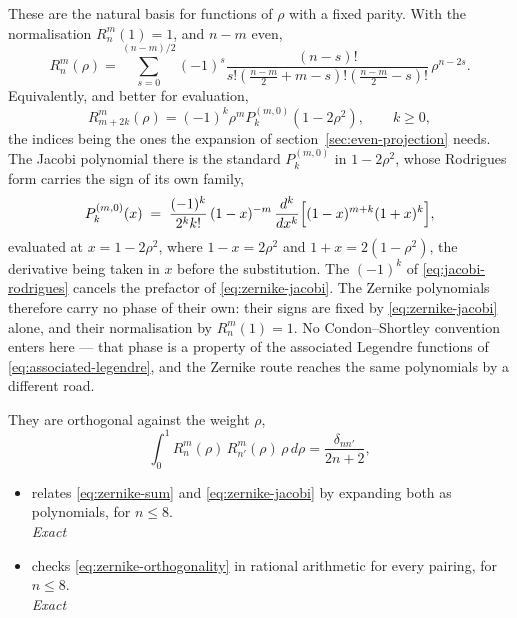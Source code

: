 These are the natural basis for functions of $\rho$ with a fixed parity.  With the
normalisation $R_n^m(1) = 1$, and $n-m$ even,
\begin{equation}
  R_n^m(\rho) = \sum_{s=0}^{(n-m)/2} (-1)^s
  \frac{(n-s)!}{s! \left(\frac{n-m}{2}+m-s\right)! \left(\frac{n-m}{2}-s\right)!}\,
  \rho^{n-2s} .
  \label{eq:zernike-sum}
\end{equation}
Equivalently, and better for evaluation,
\begin{equation}
  R_{m+2k}^m(\rho) = (-1)^{k} \rho^m P_k^{(m,0)}\!\left(1-2\rho^2\right) ,
  \qquad k \ge 0 ,
  \label{eq:zernike-jacobi}
\end{equation}
the indices being the ones the expansion of section~\ref{sec:even-projection} needs.  The Jacobi
polynomial there is the standard $P_k^{(m,0)}$ in $1-2\rho^2$, whose Rodrigues form carries the
sign of its own family,
\begin{equation}
  P_k^{(m,0)}(x) \;=\; \frac{(-1)^{k}}{2^{k}k!}\,(1-x)^{-m}\,
  \frac{d^{k}}{dx^{k}}\Bigl[(1-x)^{m+k}(1+x)^{k}\Bigr] ,
  \label{eq:jacobi-rodrigues}
\end{equation}
evaluated at $x = 1-2\rho^2$, where $1-x = 2\rho^2$ and $1+x = 2(1-\rho^2)$, the derivative
being taken in $x$ before the substitution.  The $(-1)^{k}$ of \eqref{eq:jacobi-rodrigues}
cancels the prefactor of \eqref{eq:zernike-jacobi}.  The Zernike polynomials therefore carry no
phase of their own: their signs are fixed by \eqref{eq:zernike-jacobi} alone, and their
normalisation by $R_n^m(1) = 1$.  No Condon--Shortley convention enters here --- that phase is a
property of the associated Legendre functions of \eqref{eq:associated-legendre}, and the Zernike
route reaches the same polynomials by a different road.

They are orthogonal against the weight $\rho$,
\begin{equation}
  \int_0^1 R_n^m(\rho)\, R_{n'}^m(\rho)\, \rho\, d\rho
  = \frac{\delta_{nn'}}{2n+2} ,
  \label{eq:zernike-orthogonality}
\end{equation}
\begin{itemize}
  \item[$\checkmark$]  relates \eqref{eq:zernike-sum} and
    \eqref{eq:zernike-jacobi} by expanding both as polynomials, for $n \le 8$.
    \\[1pt] \quad \emph{Exact}
  \item[$\checkmark$]  checks
    \eqref{eq:zernike-orthogonality} in rational arithmetic for every pairing, for $n \le 8$.
    \\[1pt] \quad \emph{Exact}
\end{itemize}

